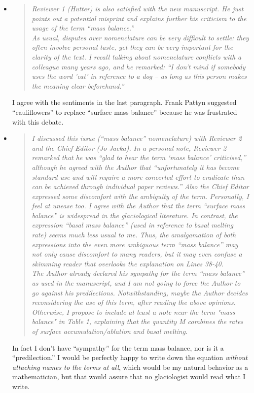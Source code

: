 \documentclass[11pt,reqno]{amsart}
\newcommand{\reply}[2]{
\medskip\medskip
\item  \begin{quote}
\emph{#1}
\end{quote}

\medskip
\noindent #2}
\begin{document}
\begin{itemize}
\label{mb}
\reply{Reviewer 1 (Hutter) is also satisfied with the new manuscript. He just points out a potential misprint and explains further his criticism to the usage of the term ``mass balance.''
\medskip \\
As usual, disputes over nomenclature can be very difficult to settle: they often involve personal taste, yet they can be very important for the clarity of the text.  I recall talking about nomenclature conflicts with a colleague many years ago, and he remarked: ``I don't mind if somebody uses the word 'cat' in reference to a dog -- as long as this person makes the meaning clear beforehand.''}
{I agree with the sentiments in the last paragraph.  Frank Pattyn suggested ``cauliflowers'' to replace ``surface mass balance'' because he was frustrated with this debate.}

\reply{I discussed this issue (``mass balance'' nomenclature) with Reviewer 2 and the Chief Editor (Jo Jacka). In a personal note, Reviewer 2 remarked that he was ``glad to hear the term `mass balance' criticised,'' although he agreed with the Author that ``unfortunately it has become standard use and will require a more concerted effort to eradicate than can be achieved through individual paper reviews.''  Also the Chief Editor expressed some discomfort with the ambiguity of the term.  Personally, I feel at unease too.  I agree with the Author that the term ``surface mass balance'' is widespread in the glaciological literature.  In contrast, the expression ``basal mass balance'' (used in reference to basal melting rate) seems much less usual to me.  Thus, the amalgamation of both expressions into the even more ambiguous term ``mass balance'' may not only cause discomfort to many readers, but it may even confuse a skimming reader that overlooks the explanation on Lines 38-40.
\medskip \\
The Author already declared his sympathy for the term ``mass balance'' as used in the manuscript, and I am not going to force the Author to go against his predilections. Notwithstanding, maybe the Author decides reconsidering the use of this term, after reading the above opinions. Otherwise, I propose to include at least a note near the term "mass balance" in Table 1, explaining that the quantity M combines the rates of surface accumulation/ablation and basal melting.}
{In fact I don't have ``sympathy'' for the term mass balance, nor is it a ``predilection.''  I would be perfectly happy to write down the equation \emph{without attaching names to the terms at all}, which would be my natural behavior as a mathematician, but that would assure that no glaciologist would read what I write.
}
\end{itemize}
\end{document}
